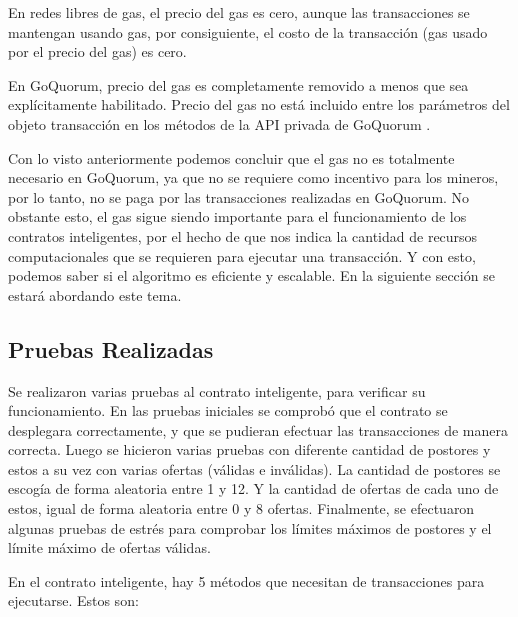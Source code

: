         En redes libres de gas, el precio del gas es cero, aunque las transacciones se mantengan usando gas,
        por consiguiente, el costo de la transacción (gas usado por el precio del gas) es cero.


        En GoQuorum, precio del gas es completamente removido a menos que sea explícitamente habilitado.
        Precio del gas no está incluido entre los parámetros del objeto transacción en los métodos de la
        API privada de GoQuorum \parencite{consensysfreegas}.


        Con lo visto anteriormente podemos concluir que el gas no es totalmente necesario en GoQuorum, ya 
        que no se requiere como incentivo para los mineros, por lo tanto, no se paga por las transacciones
        realizadas en GoQuorum. No obstante esto, el gas sigue siendo importante para el funcionamiento de
        los contratos inteligentes, por el hecho de que nos indica la cantidad de recursos computacionales que se
        requieren para ejecutar una transacción. Y con esto, podemos saber si el algoritmo es eficiente y 
        escalable. En la siguiente sección se estará abordando este tema.

        \subsection{Pruebas Realizadas}
        Se realizaron varias pruebas al contrato inteligente, para verificar su funcionamiento. En las pruebas 
        iniciales se comprobó que el contrato se desplegara correctamente, y que se pudieran efectuar las 
        transacciones de manera correcta. Luego se hicieron varias pruebas con diferente cantidad de 
        postores y estos a su vez con varias ofertas (válidas e inválidas). La cantidad de postores se 
        escogía de forma aleatoria entre 1 y 12. Y la cantidad de ofertas de cada uno de estos, igual de forma
        aleatoria entre 0 y 8 ofertas. Finalmente, se efectuaron algunas pruebas de estrés para comprobar
        los límites máximos de postores y el límite máximo de ofertas válidas.
  
  
        En el contrato inteligente, hay 5 métodos que necesitan de transacciones para ejecutarse. Estos son:
  
